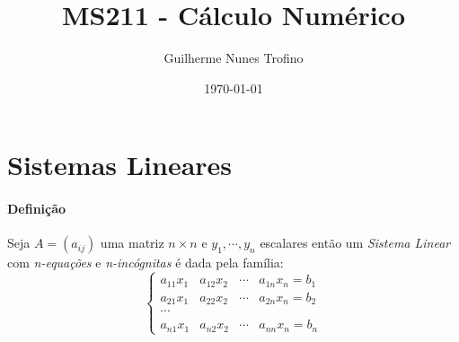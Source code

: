 \documentclass{article}
\title{MS211 - Cálculo Numérico}
\author{Guilherme Nunes Trofino}
\date{\today}
\begin{document}
        \maketitle
    \newpage

        \tableofcontents
    \newpage

    \section{Sistemas Lineares}
        \paragraph{Definição}Seja $A=(a_{ij})$ uma matriz $n \times n$ e $y_{1}, \cdots, y_{n}$ escalares então um \textit{Sistema Linear} com \textit{n-equações} e \textit{n-incógnitas} é dada pela família:
            \[
                \left\{
                    \begin{matrix}
                        a_{11}x_{1} & a_{12}x_{2} & \cdots & a_{1n}x_{n} = b_{1}\\
                        a_{21}x_{1} & a_{22}x_{2} & \cdots & a_{2n}x_{n} = b_{2}\\
                        \cdots      &             &        & \\
                        a_{n1}x_{1} & a_{n2}x_{2} & \cdots & a_{nn}x_{n} = b_{n}
                    \end{matrix}
                \right.
            \]
\end{document}
